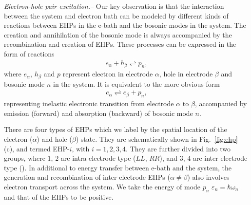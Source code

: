 \documentclass[aps
,twocolumn
,floatfix,footinbib,prl
]{revtex4-1}
\newcommand{\revision}[1]{{\color{blue}{#1}}}
\begin{document}
\emph{ Electron-hole pair excitation.--}
Our key observation is that the interaction between the system and electron bath can be modeled by different kinds of reactions between EHPs in the e-bath and the bosonic modes in the system. The creation and annihilation of the bosonic mode is always accompanied by the recombination and creation of EHPs. These processes can be expressed in the form of reactions
\begin{align}
e_\alpha + h_\beta \rightleftharpoons p_n,
\label{eq:reaction}
\end{align}
where $e_\alpha$, $h_\beta$ and $p$ represent electron in electrode $\alpha$, hole in electrode $\beta$ and bosonic mode $n$ in the system. It is equivalent to the more obvious form
\begin{align}
e_\alpha \rightleftharpoons e_\beta + p_n,
\label{eq:reaction2}
\end{align}
representing inelastic electronic transition from electrode $\alpha$ to $\beta$, accompanied by emission (forward) and absorption (backward) of bosonic mode $n$.


There are four types of EHPs which we label by the spatial location of the electron ($\alpha$) and hole  ($\beta$) state. They are schematically shown in Fig.~\ref{fig:ehp} (c), and termed EHP-$i$, with $i=1,2,3,4$. They are further divided into two groups, where $1$, $2$ are intra-electrode type ($LL$, $RR$), and $3$, $4$ are inter-electrode type (\revision{$RL$, $LR$}). In additional to energy transfer between e-bath and the system, the generation and recombination of inter-electrode EHPs ($\alpha\neq \beta$) also involves electron transport across the system. We take the energy of mode $p_n$ $\varepsilon_n=\hbar\omega_n$ and that of the EHPs to be positive. 
\end{document}
